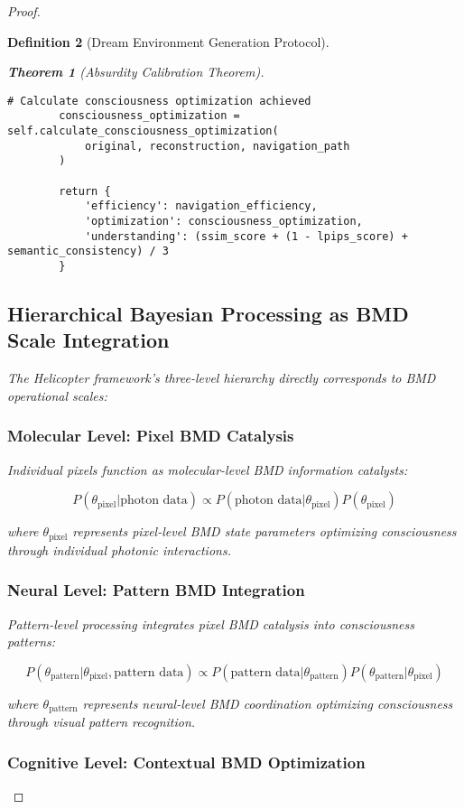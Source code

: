 \documentclass[12pt,a4paper]{article}
\newtheorem{theorem}{Theorem}[section]
\newtheorem{definition}[theorem]{Definition}
\begin{document}
\begin{proof}
\begin{definition}[Dream Environment Generation Protocol]
\begin{theorem}[Absurdity Calibration Theorem]
\begin{lstlisting}[style=pythonstyle, caption=BMD Navigation Validation Through Visual Reconstruction]
        # Calculate consciousness optimization achieved
        consciousness_optimization = self.calculate_consciousness_optimization(
            original, reconstruction, navigation_path
        )
        
        return {
            'efficiency': navigation_efficiency,
            'optimization': consciousness_optimization,
            'understanding': (ssim_score + (1 - lpips_score) + semantic_consistency) / 3
        }
\end{lstlisting}

\subsection{Hierarchical Bayesian Processing as BMD Scale Integration}

The Helicopter framework's three-level hierarchy directly corresponds to BMD operational scales:

\subsubsection{Molecular Level: Pixel BMD Catalysis}

Individual pixels function as molecular-level BMD information catalysts:

$$P(\theta_{\text{pixel}} | \text{photon data}) \propto P(\text{photon data} | \theta_{\text{pixel}}) P(\theta_{\text{pixel}})$$

where $\theta_{\text{pixel}}$ represents pixel-level BMD state parameters optimizing consciousness through individual photonic interactions.

\subsubsection{Neural Level: Pattern BMD Integration}

Pattern-level processing integrates pixel BMD catalysis into consciousness patterns:

$$P(\theta_{\text{pattern}} | \theta_{\text{pixel}}, \text{pattern data}) \propto P(\text{pattern data} | \theta_{\text{pattern}}) P(\theta_{\text{pattern}} | \theta_{\text{pixel}})$$

where $\theta_{\text{pattern}}$ represents neural-level BMD coordination optimizing consciousness through visual pattern recognition.

\subsubsection{Cognitive Level: Contextual BMD Optimization}


\end{theorem}
\end{definition}
\end{proof}
\end{document}
